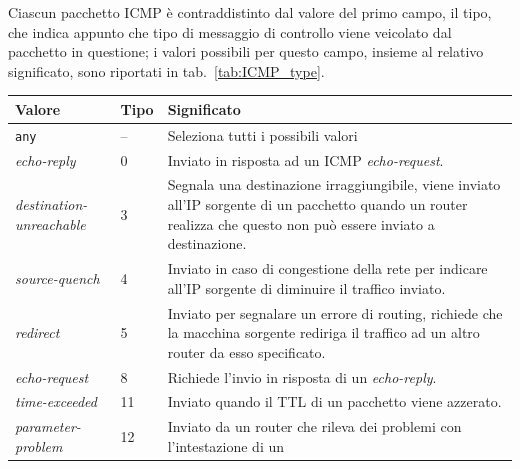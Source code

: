 Ciascun pacchetto ICMP è contraddistinto dal valore del primo campo, il tipo,
che indica appunto che tipo di messaggio di controllo viene veicolato dal
pacchetto in questione; i valori possibili per questo campo, insieme al
relativo significato, sono riportati in tab.~\ref{tab:ICMP_type}.

\begin{table}[!htb]
  \centering
  \footnotesize
  \begin{tabular}{|l|l|p{9.5cm}|}
    \hline
    \textbf{Valore}&\textbf{Tipo}&\textbf{Significato}\\
    \hline
    \hline
    \texttt{any} & -- & Seleziona tutti i possibili valori \\
    \hline
    \textit{echo-reply}             &0& Inviato in risposta ad un ICMP
                                        \textit{echo-request}.\\ 
    \textit{destination-unreachable}&3& Segnala una destinazione 
                                        irraggiungibile, viene
                                        inviato all'IP sorgente di un
                                        pacchetto quando un router realizza
                                        che questo non può essere inviato a
                                        destinazione.\\
    \textit{source-quench}          &4& Inviato in caso di congestione della
                                        rete per indicare all'IP sorgente di
                                        diminuire il traffico inviato.\\
    \textit{redirect}               &5& Inviato per segnalare un errore di
                                        routing, richiede che la macchina
                                        sorgente rediriga il traffico ad un
                                        altro router da esso specificato.\\
    \textit{echo-request}           &8& Richiede l'invio in risposta di un
                                        \textit{echo-reply}.\\
    \textit{time-exceeded}          &11& Inviato quando il TTL di un pacchetto
                                         viene azzerato.\\
    \textit{parameter-problem}      &12& Inviato da un router che rileva dei
                                         problemi con l'intestazione di un

\end{tabular}
\end{table}
